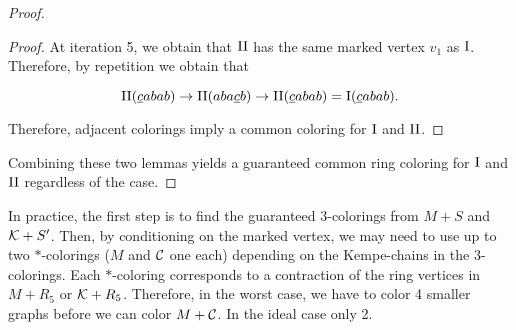 \begin{proof}
\begin{proof}
At iteration 5, we obtain that $\text{II}$ has the same marked vertex $v_1$ as $\text{I}$. Therefore, by repetition we obtain that

\begin{equation}
    \text{II}(\underline{c}abab) \rightarrow \text{II}(aba\underline{c}b) \rightarrow \text{II}(\underline{c}abab) = \text{I}(\underline{c}abab).
\end{equation}

Therefore, adjacent colorings imply a common coloring for $\text{I}$ and $\text{II}$.

\end{proof}

Combining these two lemmas yields a guaranteed common ring coloring for $\text{I}$ and $\text{II}$ regardless of the case.

\end{proof}

In practice, the first step is to find the guaranteed 3-colorings from $M+S$ and $\mathcal{K}+S'$. Then, by conditioning on the marked vertex, we may need to use up to two ${*}$-colorings ($M$ and $\mathcal{C}$ one each) depending on the Kempe-chains in the 3-colorings. Each ${*}$-coloring corresponds to a contraction of the ring vertices in $M+R_5$ or $\mathcal{K}+R_5$. Therefore, in the worst case, we have to color 4 smaller graphs before we can color $M+\mathcal{C}$. In the ideal case only 2.